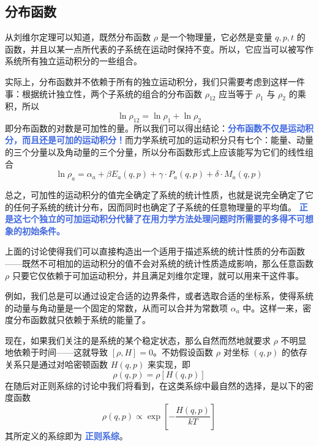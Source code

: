 \documentclass[hyperref,UTF-8]{ctexart}
\newcommand{\0}{\boldsymbol{0}}
\begin{document}
\subsection{分布函数}

从刘维尔定理可以知道，既然分布函数 $\rho$ 是一个物理量，它必然是变量 $q,p,t$ 的函数，并且以某一点所代表的子系统在运动时保持不变。所以，它应当可以被写作系统所有独立运动积分的一些组合。

实际上，分布函数并不依赖于所有的独立运动积分，我们只需要考虑到这样一件事：根据统计独立性，两个子系统的组合的分布函数 $\rho_{12}$ 应当等于 $\rho_1$ 与 $\rho_2$ 的乘积，所以
\begin{equation}\label{equ:jiahe}
    \ln\rho_{12} = \ln \rho_1 + \ln \rho_2
\end{equation}
即分布函数的对数是可加性的量。所以我们可以得出结论：\textcolor{RoyalBlue}{\textbf{\kaishu 分布函数不仅是运动积分，而且还是可加的运动积分！}}而力学系统可加的运动积分只有七个：能量、动量的三个分量以及角动量的三个分量，所以分布函数形式上应该能写为它们的线性组合
\begin{equation}\label{equ:linearcombination}
    \ln \rho_a = \alpha_a + \beta E_a(q,p) + \gamma \cdot P_a(q,p) + \delta \cdot M_a (q,p)
\end{equation}

总之，可加性的运动积分的值完全确定了系统的统计性质，也就是说完全确定了它的任何子系统的统计分布，因而同时也确定了子系统的任意物理量的平均值。 \textcolor{RoyalBlue}{\textbf{\kaishu 正是这七个独立的可加运动积分代替了在用力学方法处理问题时所需要的多得不可想象的初始条件。}}

上面的讨论使得我们可以直接构造出一个适用于描述系统的统计性质的分布函数——既然不可相加的运动积分的值不会对系统的统计性质造成影响，那么任意函数 $\rho$ 只要它仅依赖于可加运动积分，并且满足刘维尔定理，就可以用来干这件事。

例如，我们总是可以通过设定合适的边界条件，或者选取合适的坐标系，使得系统的动量与角动量是一个固定的常数，从而可以合并为常数项 $\alpha_a$ 中。这样一来，密度分布函数就只依赖于系统的能量了。

现在，如果我们关注的是系统的某个稳定状态，那么自然而然地就要求 $\rho$ 不明显地依赖于时间——这就导致 $[\rho, H] = 0$。不妨假设函数 $\rho$ 对坐标 $(q,p)$ 的依存关系只是通过对哈密顿函数 $H(q,p)$ 来实现，即
\begin{equation}
    \rho(q,p) = \rho[H(q,p)]
\end{equation} 
在随后对正则系综的讨论中我们将看到，在这类系综中最自然的选择，是以下的密度函数
\begin{equation}
    \rho(q, p) \propto \exp \left[-\frac{H(q, p)}{k T}\right]
\end{equation}
其所定义的系综即为 \textcolor{RoyalBlue}{\textbf{\kaishu 正则系综}}。
\end{document}
